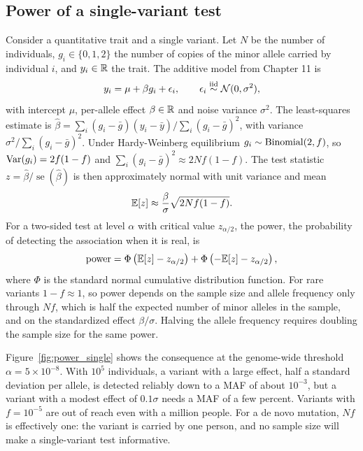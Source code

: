 \subsection{Power of a single-variant test}
\label{sec:power}

Consider a quantitative trait and a single variant. Let $N$ be the number of individuals, $g_i\in\{0,1,2\}$ the number of copies of the minor allele carried by individual $i$, and $y_i\in\mathbb{R}$ the trait. The additive model from Chapter 11 is
\begin{equation}
  y_i = \mu + \beta g_i + \epsilon_i, \qquad \epsilon_i\overset{\text{iid}}{\sim}\mathcal{N}(0,\sigma^2),
\end{equation}
with intercept $\mu$, per-allele effect $\beta\in\mathbb{R}$ and noise variance $\sigma^2$. The least-squares estimate is $\hat\beta=\sum_i(g_i-\bar g)(y_i-\bar y)/\sum_i(g_i-\bar g)^2$, with variance $\sigma^2/\sum_i(g_i-\bar g)^2$. Under Hardy-Weinberg equilibrium $g_i\sim\operatorname{Binomial}(2,f)$, so $\operatorname{Var}(g_i)=2f(1-f)$ and $\sum_i(g_i-\bar g)^2\approx 2Nf(1-f)$. The test statistic $z=\hat\beta/\operatorname{se}(\hat\beta)$ is then approximately normal with unit variance and mean
\begin{equation}
  \mathbb{E}[z] \approx \frac{\beta}{\sigma}\sqrt{2Nf(1-f)} .
  \label{eq:ncp}
\end{equation}
For a two-sided test at level $\alpha$ with critical value $z_{\alpha/2}$, the power, the probability of detecting the association when it is real, is
\begin{equation}
  \text{power} = \Phi\left(\mathbb{E}[z]-z_{\alpha/2}\right) + \Phi\left(-\mathbb{E}[z]-z_{\alpha/2}\right),
\end{equation}
where $\Phi$ is the standard normal cumulative distribution function. For rare variants $1-f\approx 1$, so power depends on the sample size and allele frequency only through $Nf$, which is half the expected number of minor alleles in the sample, and on the standardized effect $\beta/\sigma$. Halving the allele frequency requires doubling the sample size for the same power.

Figure~\ref{fig:power_single} shows the consequence at the genome-wide threshold $\alpha=5\times10^{-8}$. With $10^5$ individuals, a variant with a large effect, half a standard deviation per allele, is detected reliably down to a MAF of about $10^{-3}$, but a variant with a modest effect of $0.1\sigma$ needs a MAF of a few percent. Variants with $f=10^{-5}$ are out of reach even with a million people. For a de novo mutation, $Nf$ is effectively one: the variant is carried by one person, and no sample size will make a single-variant test informative.

